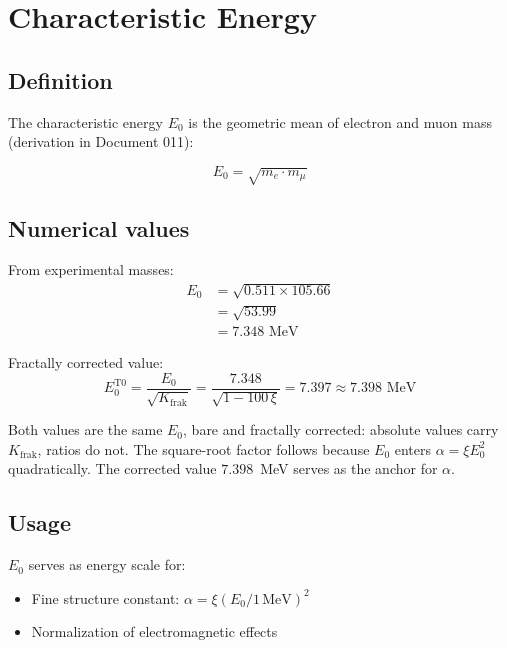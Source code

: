 	\section{Characteristic Energy}
	\label{sec:characteristic_energy}
	
	\subsection{Definition}
	
	The characteristic energy $E_0$ is the geometric mean of electron and muon mass (derivation in Document 011):
	
	\begin{equation}
		\boxed{E_0 = \sqrt{m_e \cdot m_\mu}}
		\label{eq:E0_definition}
	\end{equation}
	
	\subsection{Numerical values}
	
	From experimental masses:
	\begin{align}
		E_0 &= \sqrt{0.511 \times 105.66} \\
		&= \sqrt{53.99} \\
		&= 7.348 \text{ MeV}
	\end{align}
	
	Fractally corrected value:
	\begin{equation}
		E_0^{\text{T0}} = \frac{E_0}{\sqrt{K_{\text{frak}}}} = \frac{7.348}{\sqrt{1 - 100\,\xi}} = 7.397 \approx 7.398 \text{ MeV}
	\end{equation}

	Both values are the same $E_0$, bare and fractally corrected: absolute values carry $K_{\text{frak}}$, ratios do not. The square-root factor follows because $E_0$ enters $\alpha = \xi E_0^2$ quadratically. The corrected value $7.398$~MeV serves as the anchor for $\alpha$.

	\subsection{Usage}
	
	$E_0$ serves as energy scale for:
	\begin{itemize}
		\item Fine structure constant: $\alpha = \xi (E_0/1\,\text{MeV})^2$
		\item Normalization of electromagnetic effects
	\end{itemize}
	
